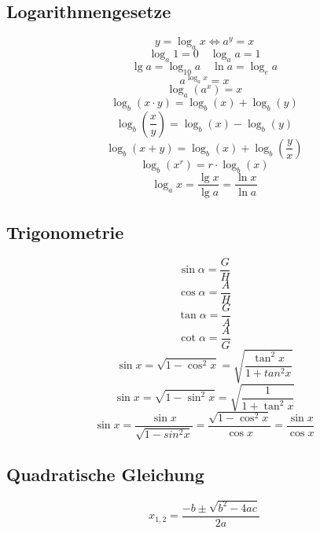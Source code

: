 \subsection{Logarithmengesetze}
\[ \boxed{y=\log_ax \Leftrightarrow a^y=x} \]
\[ \boxed{\log_a1=0 \quad \log_aa=1} \]
\[ \boxed{\lg a=\log_{10}a \quad \ln a = \log_ea} \]
\[ \boxed{a^{\log_ax}=x} \]
\[ \boxed{\log_a\left(a^x\right)=x} \]
\[ \boxed{\log_b(x \cdot y) = \log_b(x) + \log_b(y)} \]
\[ \boxed{\log_b \left( \frac{x}{y} \right) = \log_b(x) - \log_b(y)} \]
\[ \boxed{\log_b(x + y) = \log_b(x) + \log_b\left(\frac{y}{x}\right)} \]
\[ \boxed{\log_b(x^r) = r \cdot \log_b(x)} \]
\[ \boxed{\log_ax=\frac{\lg x}{\lg a}=\frac{\ln x}{\ln a}} \]

\subsection{Trigonometrie}
\[ \boxed{\sin\alpha=\frac{G}{H}} \]
\[ \boxed{\cos\alpha=\frac{A}{H}} \]
\[ \boxed{\tan\alpha=\frac{G}{A}} \]
\[ \boxed{\cot\alpha=\frac{A}{G}} \]
\[ \boxed{\sin x = \sqrt{1-\cos^2x} = \sqrt{\frac{\tan^2x}{1+tan^2x}}} \]
\[ \boxed{\sin x = \sqrt{1-\sin^2x} = \sqrt{\frac{1}{1+\tan^2x}}} \]
\[ \boxed{\sin x = \frac{\sin x}{\sqrt{1-sin^2x}} = \frac{\sqrt{1-\cos^2x}}{\cos x} = \frac{\sin x}{\cos x}} \]

\subsection{Quadratische Gleichung}
\[ \boxed{x_{1,2}=\frac{-b\pm\sqrt{b^2-4ac}}{2a}} \]


